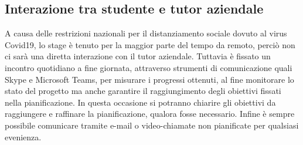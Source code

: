 \subsection{Interazione tra studente e tutor aziendale}

A causa delle restrizioni nazionali per il distanziamento sociale dovuto al virus Covid19, lo stage è tenuto per la maggior parte del tempo da remoto, perciò non ci sarà una diretta interazione con il tutor aziendale. Tuttavia è fissato un incontro quotidiano a fine giornata, attraverso strumenti di comunicazione quali Skype e Microsoft Teams, per misurare i progressi ottenuti, al fine monitorare lo stato del progetto ma anche garantire il raggiungimento degli obiettivi fissati nella pianificazione. In questa occasione si potranno chiarire gli obiettivi da raggiungere e raffinare la pianificazione, qualora fosse necessario.
Infine è sempre possibile comunicare tramite e-mail o video-chiamate non pianificate per qualsiasi evenienza.